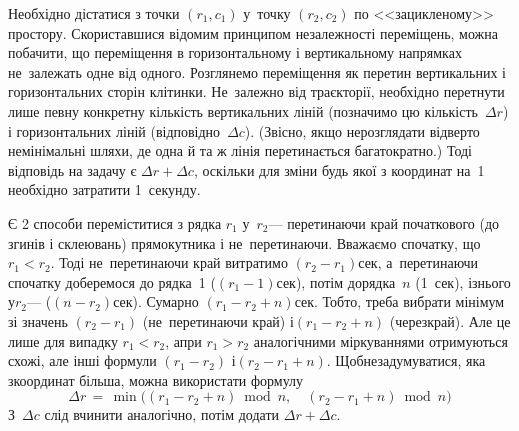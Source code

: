 {

\Tutorial	Необхідно дістатися з точки $(r_1, c_1)$ у~точку $(r_2, c_2)$ по <<зацикленому>> простору. 
Скориставшися відомим принципом незалежності переміщень, можна побачити, що переміщення в горизонтальному і вертикальному напрямках не~залежать одне від одного. Розглянемо переміщення як перетин вертикальних і горизонтальних сторін клітинки. Не~залежно від траєкторії, необхідно перетнути лише певну конкретну кількість вертикальних ліній (позначимо цю кількість~$\Delta{}r$) і горизонтальних ліній (відповідно~$\Delta{}c$). (Звісно, якщо не\nolinebreak[3] розглядати відверто не\nolinebreak[3] мінімальні шляхи, де одна й та ж лінія перетинається багатократно.) Тоді відповідь на задачу є ${\Delta{}r+\Delta{}c}$, оскільки для зміни будь якої з координат на~1 необхідно затратити 1~секунду.

Є 2 способи переміститися з рядка $r_1$ у~$r_2$\nolinebreak[3] --- перетинаючи край початкового (до згинів і склеювань) прямокутника і не~перетинаючи. Вважаємо спочатку, що ${r_1{<}r_2}$. Тоді не~перетинаючи край витратимо ${(r_2{-}r_1)}$\nolinebreak[2] сек, а~перетинаючи спочатку доберемося до рядка~1 (${(r_1{-}1)}$\nolinebreak[2] сек),  потім до\nolinebreak[1] рядка~$n$ (1~сек), і\nolinebreak[2] з\nolinebreak[2] нього у\nolinebreak[3] $r_2$\nolinebreak[3] --- (${(n{-}r_2)}$\nolinebreak[2] сек). Сумарно ${(r_1{-}r_2{+}n)}$\nolinebreak[2] сек. 
Тобто, треба вибрати мінімум зі значень ${(r_2{-}r_1)}$ (не~перетинаючи край) і\nolinebreak[3] ${(r_1{-}r_2{+}n)}$ (через\nolinebreak[3] край). Але це лише для випадку ${r_1{<}r_2}$, а\nolinebreak[3] при ${r_1{>}r_2}$ аналогічними міркуваннями отримуються схожі, але інші формули ${(r_1{-}r_2)}$ і\nolinebreak[3] ${(r_2{-}r_1{+}n)}$. Щоб\nolinebreak[2] не\nolinebreak[2] задумуватися, яка з\nolinebreak[3] координат більша, можна використати формулу
$$
\Delta{}r \, = \, \min\bigl((r_1-r_2+n) \bmod n,\quad (r_2-r_1+n) \bmod n\bigr)
$$
З~$\Delta{}c$ слід вчинити аналогічно, потім додати ${\Delta{}r+\Delta{}c}$.

}